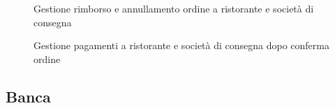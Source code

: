 \documentclass[11pt]{article} %
\begin{document}
\clearpage

\begin{figure}[H]
\centering
{}
\caption{Gestione rimborso e annullamento ordine a ristorante e società di consegna}
\end{figure}

\begin{figure}[H]
\caption{Gestione pagamenti a ristorante e società di consegna dopo conferma ordine}
\end{figure}

\subsection{Banca}
\end{document}
